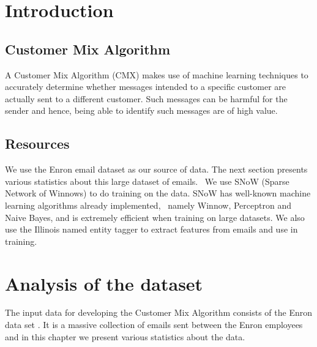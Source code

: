 \documentclass[senior,oneside]{UIUC}
\begin{document}
 \frontmatter

 \makepreliminarypages

 \tableofcontents

 \mainmatter


\chapter{Introduction}

\section{Customer Mix Algorithm}

A Customer Mix Algorithm (CMX) makes use of machine learning techniques to accurately determine whether messages intended to a specific customer are actually sent to a different customer. Such messages can be harmful for the sender and hence, being able to identify such messages are of high value. 

\section{Resources}

We use the Enron email dataset \cite{enrondataset} as our source of data. The next section presents various statistics about this large dataset of emails. \
We use SNoW (Sparse Network of Winnows) \cite{snow} to do training on the data. SNoW has well-known machine learning algorithms already implemented, \
namely Winnow, Perceptron and Naive Bayes, and is extremely efficient when training on large datasets. We also use the Illinois named entity tagger \cite{nertagger} to extract features from emails and use in  training. 

\chapter{Analysis of the dataset}

The input data for developing the Customer Mix Algorithm consists of the Enron data set \cite{enrondataset}. It is a massive collection of emails sent between the Enron employees and in this chapter we present various statistics about the data.
\end{document}
